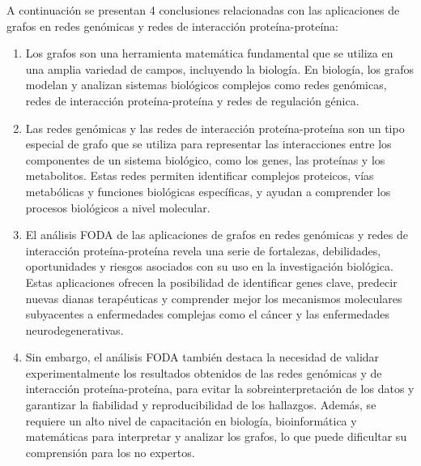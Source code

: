 \documentclass[11pt, a4paper]{article}
\begin{document}
A continuación se presentan 4 conclusiones relacionadas con las aplicaciones de grafos en redes genómicas y redes de interacción proteína-proteína:

\begin{enumerate}
  \item Los grafos son una herramienta matemática fundamental que se utiliza en una amplia variedad de campos, incluyendo la biología. En biología, los grafos modelan y analizan sistemas biológicos complejos como redes genómicas, redes de interacción proteína-proteína y redes de regulación génica.
  
  \item Las redes genómicas y las redes de interacción proteína-proteína son un tipo especial de grafo que se utiliza para representar las interacciones entre los componentes de un sistema biológico, como los genes, las proteínas y los metabolitos. Estas redes permiten identificar complejos proteicos, vías metabólicas y funciones biológicas específicas, y ayudan a comprender los procesos biológicos a nivel molecular.
  
  \item El análisis FODA de las aplicaciones de grafos en redes genómicas y redes de interacción proteína-proteína revela una serie de fortalezas, debilidades, oportunidades y riesgos asociados con su uso en la investigación biológica. Estas aplicaciones ofrecen la posibilidad de identificar genes clave, predecir nuevas dianas terapéuticas y comprender mejor los mecanismos moleculares subyacentes a enfermedades complejas como el cáncer y las enfermedades neurodegenerativas.
  
  \item Sin embargo, el análisis FODA también destaca la necesidad de validar experimentalmente los resultados obtenidos de las redes genómicas y de interacción proteína-proteína, para evitar la sobreinterpretación de los datos y garantizar la fiabilidad y reproducibilidad de los hallazgos. Además, se requiere un alto nivel de capacitación en biología, bioinformática y matemáticas para interpretar y analizar los grafos, lo que puede dificultar su comprensión para los no expertos.
\end{enumerate}
\end{document}
